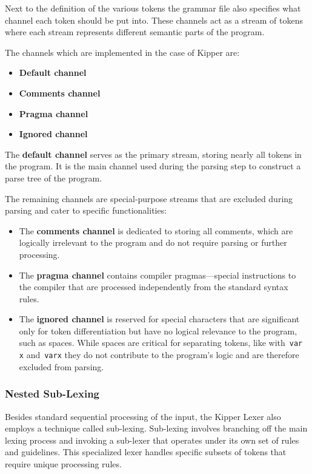 Next to the definition of the various tokens the grammar file also specifies what channel each token should be put into. These channels act as a stream of tokens where each stream represents different semantic parts of the program.

The channels which are implemented in the case of Kipper are:

\begin{itemize}
	\item \textbf{Default channel}
	\item \textbf{Comments channel}
	\item \textbf{Pragma channel}
	\item \textbf{Ignored channel}
\end{itemize}

The \textbf{default channel} serves as the primary stream, storing nearly all tokens in the program. It is the main channel used during the parsing step to construct a parse tree of the program.

The remaining channels are special-purpose streams that are excluded during parsing and cater to specific functionalities:

\begin{itemize}
	\item The \textbf{comments channel} is dedicated to storing all comments, which are logically irrelevant to the program and do not require parsing or further processing.
	\item The \textbf{pragma channel} contains compiler pragmas—special instructions to the compiler that are processed independently from the standard syntax rules.
	\item The \textbf{ignored channel} is reserved for special characters that are significant only for token differentiation but have no logical relevance to the program, such as spaces. While spaces are critical for separating tokens, like with~\lstinline|var x| and~\lstinline|varx| they do not contribute to the program's logic and are therefore excluded from parsing.
\end{itemize}
	
\subsubsection{Nested Sub-Lexing}
\label{sec:nested-sub-lexing}

Besides standard sequential processing of the input, the Kipper Lexer also employs a technique called sub-lexing. Sub-lexing involves branching off the main lexing process and invoking a sub-lexer that operates under its own set of rules and guidelines. This specialized lexer handles specific subsets of tokens that require unique processing rules.

